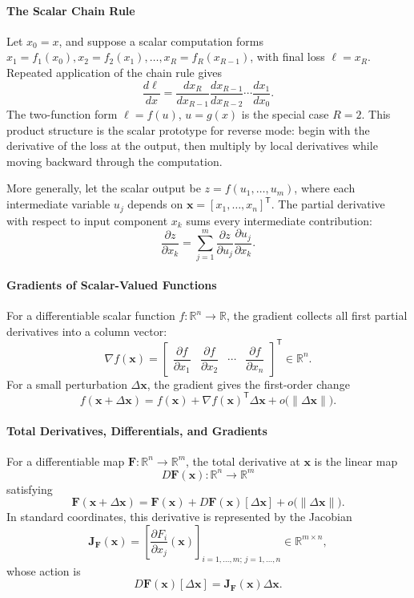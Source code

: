 \documentclass{article}
\begin{document}
\paragraph{The Scalar Chain Rule}
Let \(x_0=x\), and suppose a scalar computation forms
\(x_1=f_1(x_0),x_2=f_2(x_1),\ldots,x_R=f_R(x_{R-1})\), with final loss
\(\ell=x_R\). Repeated application of the chain rule gives
\[
  \frac{d\ell}{dx}
  =
  \frac{dx_R}{dx_{R-1}}
  \frac{dx_{R-1}}{dx_{R-2}}
  \cdots
  \frac{dx_1}{dx_0}.
\]
The two-function form \(\ell=f(u)\), \(u=g(x)\) is the special case
\(R=2\). This product structure is the scalar prototype for reverse
mode: begin with the derivative of the loss at the output, then
multiply by local derivatives while moving backward through the
computation.

More generally, let the scalar output be \(z=f(u_1,\ldots,u_m)\), where
each intermediate variable \(u_j\) depends on
\(\mathbf{x}=[x_1,\ldots,x_n]^\mathsf{T}\). The partial derivative with
respect to input component \(x_k\) sums every intermediate contribution:
\[
  \frac{\partial z}{\partial x_k}
  =
  \sum_{j=1}^{m}
  \frac{\partial z}{\partial u_j}
  \frac{\partial u_j}{\partial x_k}.
\]

\paragraph{Gradients of Scalar-Valued Functions}
For a differentiable scalar function \(f:\mathbb{R}^n\to\mathbb{R}\),
the gradient collects all first partial derivatives into a column vector:
\[
  \nabla f(\mathbf{x})
  =
  \begin{bmatrix}
    \dfrac{\partial f}{\partial x_1} &
    \dfrac{\partial f}{\partial x_2} &
    \cdots &
    \dfrac{\partial f}{\partial x_n}
  \end{bmatrix}^{\mathsf{T}}
  \in\mathbb{R}^n.
\]
For a small perturbation \(\Delta\mathbf{x}\), the gradient gives the
first-order change
\[
  f(\mathbf{x}+\Delta\mathbf{x})
  =
  f(\mathbf{x})
  +
  \nabla f(\mathbf{x})^\mathsf{T}\Delta\mathbf{x}
  +
  o\bigl(\lVert\Delta\mathbf{x}\rVert\bigr).
\]

\paragraph{Total Derivatives, Differentials, and Gradients}
For a differentiable map
\(\mathbf{F}:\mathbb{R}^n\to\mathbb{R}^m\), the total derivative at
\(\mathbf{x}\) is the linear map
\[
  D\mathbf{F}(\mathbf{x}):\mathbb{R}^n\to\mathbb{R}^m
\]
satisfying
\[
  \mathbf{F}(\mathbf{x}+\Delta\mathbf{x})
  =
  \mathbf{F}(\mathbf{x})
  +
  D\mathbf{F}(\mathbf{x})[\Delta\mathbf{x}]
  +
  o\bigl(\lVert\Delta\mathbf{x}\rVert\bigr).
\]
In standard coordinates, this derivative is represented by the
Jacobian
\[
  \mathbf{J}_{\mathbf{F}}(\mathbf{x})
  =
  \left[
    \frac{\partial F_i}{\partial x_j}(\mathbf{x})
  \right]_{i=1,\ldots,m;\,j=1,\ldots,n}
  \in\mathbb{R}^{m\times n},
\]
whose action is
\[
  D\mathbf{F}(\mathbf{x})[\Delta\mathbf{x}]
  =
  \mathbf{J}_{\mathbf{F}}(\mathbf{x})\Delta\mathbf{x}.
\]
\end{document}
